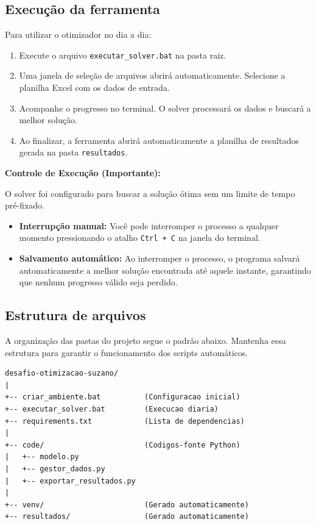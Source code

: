 \subsection{Execução da ferramenta}

Para utilizar o otimizador no dia a dia:

\begin{enumerate}
    \item Execute o arquivo \texttt{executar\_solver.bat} na pasta raiz.
    \item Uma janela de seleção de arquivos abrirá automaticamente. Selecione a planilha Excel com os dados de entrada.
    \item Acompanhe o progresso no terminal. O solver processará os dados e buscará a melhor solução.
    \item Ao finalizar, a ferramenta abrirá automaticamente a planilha de resultados gerada na pasta \texttt{resultados}.
\end{enumerate}

\vspace{0.3cm}

\textbf{Controle de Execução (Importante):}

O solver foi configurado para buscar a solução ótima sem um limite de tempo pré-fixado.
\begin{itemize}
    \item \textbf{Interrupção manual:} Você pode interromper o processo a qualquer momento pressionando o atalho \texttt{Ctrl + C} na janela do terminal.
    \item \textbf{Salvamento automático:} Ao interromper o processo, o programa salvará automaticamente a melhor solução encontrada até aquele instante, garantindo que nenhum progresso válido seja perdido.
\end{itemize}


\subsection{Estrutura de arquivos}

A organização das pastas do projeto segue o padrão abaixo. Mantenha essa estrutura para garantir o funcionamento dos scripts automáticos.

\begin{verbatim}
desafio-otimizacao-suzano/
|
+-- criar_ambiente.bat          (Configuracao inicial)
+-- executar_solver.bat         (Execucao diaria)
+-- requirements.txt            (Lista de dependencias)
|
+-- code/                       (Codigos-fonte Python)
|   +-- modelo.py
|   +-- gestor_dados.py
|   +-- exportar_resultados.py
|
+-- venv/                       (Gerado automaticamente)
+-- resultados/                 (Gerado automaticamente)
\end{verbatim}

